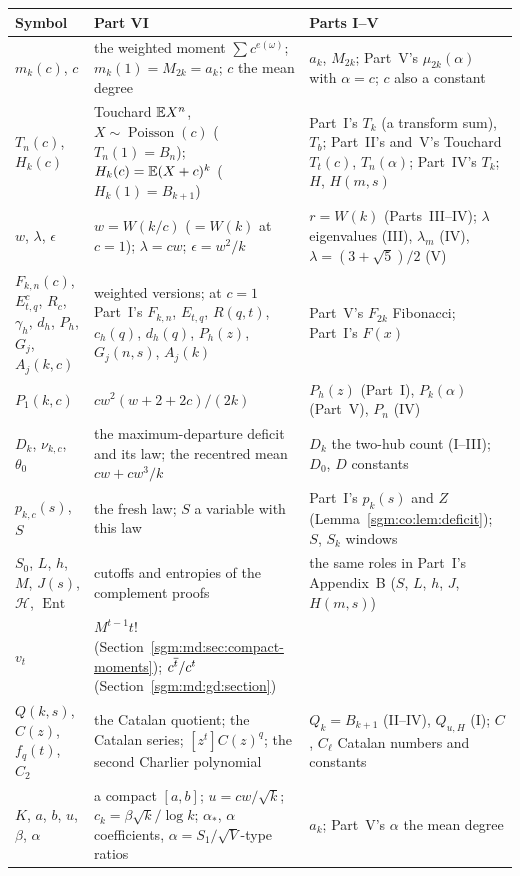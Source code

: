 \documentclass[11pt,letterpaper]{article}
\theoremstyle{remark}\newtheorem{remark}[theorem]{Remark}
\newcommand{\Poi}{\operatorname{Poisson}}\newcommand{\Bin}{\operatorname{Bin}}
\theoremstyle{definition}\newtheorem{definition}[theorem]{Definition}
\begin{document}
\begingroup\small
\renewcommand{\arraystretch}{1.1}
\renewcommand{\theHtable}{sgmmd.notation}%
\begin{longtable}{@{}>{\raggedright\arraybackslash}p{0.95in}>{\raggedright\arraybackslash}p{3.0in}>{\raggedright\arraybackslash}p{2.2in}@{}}
\toprule
Symbol & Part VI & Parts I--V\\
\midrule
\endhead
$m_k(c)$, $c$ & the weighted moment $\sum c^{e(\omega)}$; $m_k(1)=M_{2k}=a_k$; $c$ the mean degree & $a_k$, $M_{2k}$; Part~V's $\mu_{2k}(\alpha)$ with $\alpha=c$; $c$ also a constant\\
$T_n(c)$, $H_k(c)$ & Touchard $\mathbb E X^n$, $X\sim\Poi(c)$ ($T_n(1)=B_n$); $H_k(c)=\mathbb E(X+c)^k$ ($H_k(1)=B_{k+1}$) & Part~I's $T_k$ (a transform sum), $T_b$; Part~II's and~V's Touchard $T_t(c)$, $T_n(\alpha)$; Part~IV's $T_k$; $H$, $H(m,s)$\\
$w$, $\lambda$, $\epsilon$ & $w=W(k/c)$ ($=W(k)$ at $c=1$); $\lambda=cw$; $\epsilon=w^2/k$ & $r=W(k)$ (Parts~III--IV); $\lambda$ eigenvalues (III), $\lambda_m$ (IV), $\lambda=(3+\sqrt5)/2$ (V)\\
$F_{k,n}(c)$, $E^c_{t,q}$, $R_c$, $\gamma_h$, $d_h$, $P_h$, $G_j$, $A_j(k,c)$ & weighted versions; at $c=1$ Part~I's $F_{k,n}$, $E_{t,q}$, $R(q,t)$, $c_h(q)$, $d_h(q)$, $P_h(z)$, $G_j(n,s)$, $A_j(k)$ & Part~V's $F_{2k}$ Fibonacci; Part~I's $F(x)$\\
$P_1(k,c)$ & $cw^2(w+2+2c)/(2k)$ & $P_h(z)$ (Part~I), $P_k(\alpha)$ (Part~V), $P_n$ (IV)\\
$D_k$, $\nu_{k,c}$, $\theta_0$ & the maximum-departure deficit and its law; the recentred mean $cw+cw^3/k$ & $D_k$ the two-hub count (I--III); $D_0$, $D$ constants\\
$p_{k,c}(s)$, $S$ & the fresh law; $S$ a variable with this law & Part~I's $p_k(s)$ and $Z$ (Lemma~\ref{sgm:co:lem:deficit}); $S$, $S_k$ windows\\
$S_0$, $L$, $h$, $M$, $J(s)$, $\mathcal H$, $\operatorname{Ent}$ & cutoffs and entropies of the complement proofs & the same roles in Part~I's Appendix~B ($S$, $L$, $h$, $J$, $H(m,s)$)\\
$v_t$ & $M^{t-1}t!$ (Section~\ref{sgm:md:sec:compact-moments}); $c^{\overline{t}}/c^t$ (Section~\ref{sgm:md:gd:section}) & \\
$Q(k,s)$, $C(z)$, $f_q(t)$, $C_2$ & the Catalan quotient; the Catalan series; $[z^t]C(z)^q$; the second Charlier polynomial & $Q_k=B_{k+1}$ (II--IV), $Q_{u,H}$ (I); $C$, $C_\ell$ Catalan numbers and constants\\
$K$, $a$, $b$, $u$, $\beta$, $\alpha$ & a compact $[a,b]$; $u=cw/\sqrt k$; $c_k=\beta\sqrt k/\log k$; $\alpha_*$, $\alpha$ coefficients, $\alpha=S_1/\sqrt V$-type ratios & $a_k$; Part~V's $\alpha$ the mean degree\\

\end{longtable}
\end{document}
